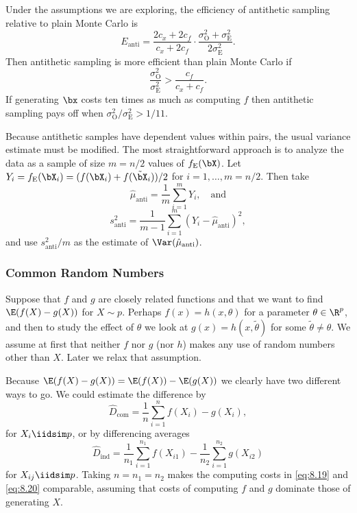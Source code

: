 Under the assumptions we are exploring, the efficiency of antithetic sampling relative to plain Monte Carlo is
\begin{equation} \label{eq:EfficiencyRatio}
	E_{\mathrm{anti}} = \frac{2c_x + 2c_f}{c_x + 2c_f} \cdot \frac{\sigma_{\mathrm{O}}^2 + \sigma_{\mathrm{E}}^2}{2\sigma_{\mathrm{E}}^2}.
\end{equation}
Then antithetic sampling is more efficient than plain Monte Carlo if
\begin{equation*}
	\frac{\sigma_{\mathrm{O}}^2}{\sigma_{\mathrm{E}}^2} > \frac{c_f}{c_x + c_f}.
\end{equation*}
If generating \(\bx\) costs ten times as much as computing \(f\) then antithetic sampling pays off when \(\sigma_{\mathrm{O}}^2/\sigma_{\mathrm{E}}^2 > 1/11\).

Because antithetic samples have dependent values within pairs, the usual variance estimate must be modified. The most straightforward approach is to analyze the data as a sample of size \(m = n/2\) values of \(f_{\mathrm{E}}(\bX)\). Let \(Y_i = f_{\mathrm{E}}(\bX_i) = (f(\bX_i) + f(\tilde{\bX}_i))/2\) for \(i = 1, \dots, m = n/2\). Then take
\begin{equation*}
	\hat{\mu}_{\mathrm{anti}} = \frac{1}{m} \sum_{i=1}^m Y_i, \quad \text{and}
\end{equation*}
\begin{equation*}
	s_{\mathrm{anti}}^2 = \frac{1}{m-1} \sum_{i=1}^m (Y_i - \hat{\mu}_{\mathrm{anti}})^2,
\end{equation*}
and use \(s_{\mathrm{anti}}^2/m\) as the estimate of \(\Var(\hat{\mu}_{\mathrm{anti}})\).

\subsubsection{Common Random Numbers}
Suppose that \(f\) and \(g\) are closely related functions and that we want to find \(\E(f(X) - g(X))\) for \(X \sim p\). Perhaps \(f(x) = h(x, \theta)\) for a parameter \(\theta \in \R^p\), and then to study the effect of \(\theta\) we look at \(g(x) = h(x, \widetilde{\theta})\) for some \(\widetilde{\theta} \neq \theta\). We assume at first that neither \(f\) nor \(g\) (nor \(h\)) makes any use of random numbers other than \(X\). Later we relax that assumption.

Because \(\E(f(X)-g(X)) = \E(f(X))-\E(g(X))\) we clearly have two different ways to go. We could estimate the difference by
\begin{equation}
	\widehat{D}_{\text{com}} = \frac{1}{n} \sum_{i=1}^n f(X_i) - g(X_i),
	\label{eq:8.19}
\end{equation}
for \(X_i \iidsim p\), or by differencing averages
\begin{equation}
	\widehat{D}_{\text{ind}} = \frac{1}{n_1} \sum_{i=1}^{n_1} f(X_{i1}) - \frac{1}{n_2} \sum_{i=1}^{n_2} g(X_{i2})
	\label{eq:8.20}
\end{equation}
for \(X_{ij} \iidsim p\). Taking \(n = n_1 = n_2\) makes the computing costs in \eqref{eq:8.19} and \eqref{eq:8.20} comparable, assuming that costs of computing \(f\) and \(g\) dominate those of generating \(X\).

